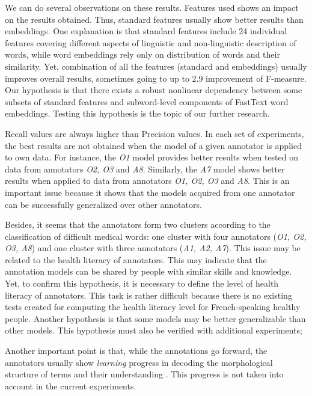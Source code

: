 We can do several observations on these results.
Features used shows an impact on the results obtained. Thus, standard
features usually show better results than embeddings. One explanation
is that standard features include 24 individual features covering
different aspects of linguistic and non-linguistic description of
words, while word embeddings rely only on distribution of words and
their similarity. Yet, combination of all the features (standard and
embeddings) usually improves overall results, sometimes going to up to
2.9 improvement of F-measure.  Our hypothesis is that there exists a
robust nonlinear dependency between some subsets of standard features
and subword-level components of FastText word embeddings. Testing this
hypothesis is the topic of our further research.

Recall values are always higher than Precision values.
In each set of experiments, the best results are not obtained when the
model of a given annotator is applied to own data. For instance, the
{\it O1} model provides better results when tested on data from
annotators {\it O2, O3} and {\it A8}.  Similarly, the {\it A7} model
shows better results when applied to data from annotators {\it O1, O2,
  O3} and {\it A8}. This is an important issue because it shows that
the models acquired from one annotator can be successfully generalized
over other annotators.

Besides, it seems that the annotators form two clusters according to
the classification of difficult medical words: one cluster with four
annotators ({\it O1, O2, O3, A8}) and one cluster with three
annotators ({\it A1, A2, A7}). This issue may be related to the health
literacy of annotators. This may indicate that the annotation models
can be shared by people with similar skills and knowledge. Yet, to
confirm this hypothesis, it is necessary to define the level of health
literacy of annotators. This task is rather difficult because there is
no existing tests created for computing the health literacy level for
French-speaking healthy people. Another hypothesis is that some models
may be better generalizable than other models. This hypothesis must
also be verified with additional experiments;

Another important point is that, while the annotations go forward, the
annotators usually show {\it learning} progress in decoding the
morphological structure of terms and their understanding
\citep{Grabar-BIONLP2017}. This progress is not taken into account in
the current experiments.


